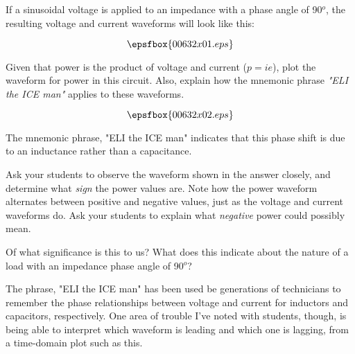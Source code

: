 

If a sinusoidal voltage is applied to an impedance with a phase angle of 90$^{o}$, the resulting voltage and current waveforms will look like this:

$$\epsfbox{00632x01.eps}$$

Given that power is the product of voltage and current ($p = i e$), plot the waveform for power in this circuit.  Also, explain how the mnemonic phrase {\it "ELI the ICE man"} applies to these waveforms.







$$\epsfbox{00632x02.eps}$$

The mnemonic phrase, "ELI the ICE man" indicates that this phase shift is due to an inductance rather than a capacitance.







Ask your students to observe the waveform shown in the answer closely, and determine what {\it sign} the power values are.  Note how the power waveform alternates between positive and negative values, just as the voltage and current waveforms do.  Ask your students to explain what {\it negative} power could possibly mean.

Of what significance is this to us?  What does this indicate about the nature of a load with an impedance phase angle of 90$^{o}$?

\vskip 10pt

The phrase, "ELI the ICE man" has been used be generations of technicians to remember the phase relationships between voltage and current for inductors and capacitors, respectively.  One area of trouble I've noted with students, though, is being able to interpret which waveform is leading and which one is lagging, from a time-domain plot such as this.




